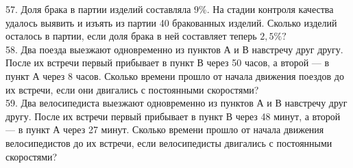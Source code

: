 57. Доля брака в партии изделий составляла $9\%.$ На стадии контроля качества удалось выявить и изъять из партии 40 бракованных изделий. Сколько изделий осталось в партии, если доля брака в ней составляет теперь $2,5\%?$\\
58. Два поезда выезжают одновременно из пунктов А и В навстречу друг другу. После их встречи первый прибывает в пункт В через 50 часов, а второй --- в пункт А через 8 часов. Сколько времени прошло от начала движения поездов до их встречи, если они двигались с постоянными скоростями?\\
59. Два велосипедиста выезжают одновременно из пунктов А и В навстречу друг другу. После их встречи первый прибывает в пункт В через 48 минут, а второй --- в пункт А через 27 минут. Сколько времени прошло от начала движения велосипедистов до их встречи, если велосипедисты двигались с постоянными скоростями?
\newpage
